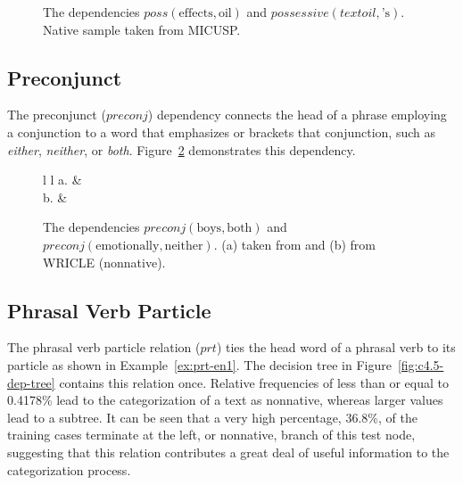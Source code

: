 \documentclass[main.tex]{subfiles}
\begin{document}
\begin{figure}[htbp]
\caption{The dependencies $poss(\text{effects}, \text{oil})$ and $possessive(text{oil}, \text{'s})$. Native sample taken from MICUSP.}
\centering
{}
\label{fig:poss-deps}
\end{figure}

\subsection{Preconjunct}

The preconjunct ($preconj$) dependency connects the head of a phrase employing a conjunction to a word that emphasizes or brackets that conjunction, such as \textit{either}, \textit{neither}, or \textit{both}. Figure~\ref{fig:preconj-dep} demonstrates this dependency.

\begin{figure}[h]
\caption{The dependencies $preconj(\text{boys},\text{both})$ and $preconj(\text{emotionally},\text{neither})$. (a) taken from \citet{typed-deps-manual} and (b) from WRICLE (nonnative).}
\centering
\begin{tabular}{ l l }
a. &
\\

b. &

\label{fig:preconj-dep}
\end{tabular}
\end{figure}


\subsection{Phrasal Verb Particle}

The phrasal verb particle relation ($prt$) ties the head word of a phrasal verb to its particle as shown in Example~\ref{ex:prt-en1}. The decision tree in Figure~\ref{fig:c4.5-dep-tree} contains this relation once. Relative frequencies of less than or equal to 0.4178\% lead to the categorization of a text as nonnative, whereas larger values lead to a subtree. It can be seen that a very high percentage, 36.8\%, of the training cases terminate at the left, or nonnative, branch of this test node, suggesting that this relation contributes a great deal of useful information to the categorization process.
\end{document}
